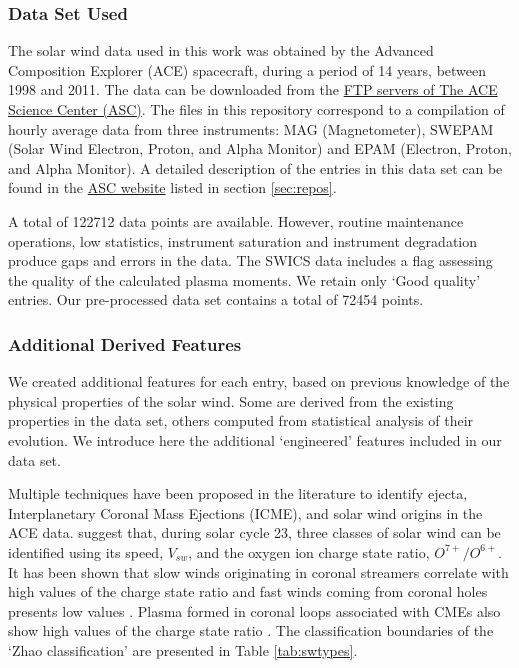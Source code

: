 \subsubsection{Data Set Used}
The solar wind data used in this work was obtained by the Advanced Composition Explorer (ACE) spacecraft, during a period of 14 years, between 1998 and 2011. The data can be downloaded from the \href{ftp://mussel.srl.caltech.edu/pub/ace/level2/multi}{FTP servers of The ACE Science Center (ASC)}. The files in this repository correspond to a compilation of hourly average data from three instruments: MAG (Magnetometer), SWEPAM (Solar Wind Electron, Proton, and Alpha Monitor) and EPAM (Electron, Proton, and Alpha Monitor). A detailed description of the entries in this data set can be found in the \href{http://www.srl.caltech.edu/cgi-bin/dib/rundibviewmultil2/ACE/ASC/DATA/level2/multi}{ASC website} listed in section \ref{sec:repos}.

A total of 122712 data points are available. However, routine maintenance operations, low statistics, instrument saturation and instrument degradation produce gaps and errors in the data. The SWICS data includes a flag assessing the quality of the calculated plasma moments. We retain only `Good quality' entries. Our pre-processed data set contains a total of 72454 points.

\subsubsection{Additional Derived Features}
We created additional features for each entry, based on previous knowledge of the physical properties of the solar wind. Some are derived from the existing properties in the data set, others computed from statistical analysis of their evolution. We introduce here the additional `engineered' features included in our data set.

Multiple techniques have been proposed in the literature to identify ejecta, Interplanetary Coronal Mass Ejections (ICME), and solar wind origins in the ACE data. \citep{Zhao2009} suggest that, during solar cycle 23, three classes of solar wind can be identified using its speed, $V_{sw}$, and the oxygen ion charge state ratio, $O^{7+}/O^{6+}$. It has been shown that slow winds originating in coronal streamers correlate with high values of the charge state ratio and fast winds coming from coronal holes presents low values \citep{DAmicis2015}. Plasma formed in coronal loops associated with CMEs also show high values of the charge state ratio \citep{Xu2015b}. The classification boundaries of the `Zhao classification' are presented in Table \ref{tab:swtypes}.

